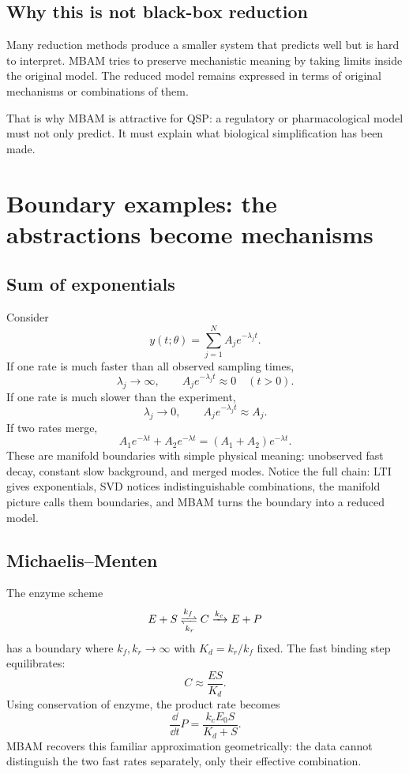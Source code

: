 \documentclass[a4paper]{article}
\newcommand{\ddt}{\frac{\dd}{\dd t}}
\newcommand{\param}{\theta}
\begin{document}
\subsection{Why this is not black-box reduction}

Many reduction methods produce a smaller system that predicts well but is hard to interpret.  MBAM tries to preserve mechanistic meaning by taking limits inside the original model.  The reduced model remains expressed in terms of original mechanisms or combinations of them.

That is why MBAM is attractive for QSP: a regulatory or pharmacological model must not only predict.  It must explain what biological simplification has been made.

\section{Boundary examples: the abstractions become mechanisms}

\subsection{Sum of exponentials}

Consider
\[
  y(t;\param)
  =
  \sum_{j=1}^N A_j e^{-\lambda_j t}.
\]
If one rate is much faster than all observed sampling times,
\[
  \lambda_j\to\infty,
  \qquad
  A_j e^{-\lambda_j t}\approx 0
  \quad(t>0).
\]
If one rate is much slower than the experiment,
\[
  \lambda_j\to 0,
  \qquad
  A_j e^{-\lambda_j t}\approx A_j.
\]
If two rates merge,
\[
  A_1e^{-\lambda t}+A_2e^{-\lambda t}
  =
  (A_1+A_2)e^{-\lambda t}.
\]
These are manifold boundaries with simple physical meaning: unobserved fast decay, constant slow background, and merged modes.  Notice the full chain: LTI gives exponentials, SVD notices indistinguishable combinations, the manifold picture calls them boundaries, and MBAM turns the boundary into a reduced model.

\subsection{Michaelis--Menten}

The enzyme scheme
\[
  E+S
  \xrightleftharpoons[k_r]{k_f}
  C
  \xrightarrow{k_c}
  E+P
\]
has a boundary where \(k_f,k_r\to\infty\) with \(K_d=k_r/k_f\) fixed.  The fast binding step equilibrates:
\[
  C\approx \frac{E S}{K_d}.
\]
Using conservation of enzyme, the product rate becomes
\[
  \ddt P
  =
  \frac{k_c E_0 S}{K_d+S}.
\]
MBAM recovers this familiar approximation geometrically: the data cannot distinguish the two fast rates separately, only their effective combination.
\end{document}
